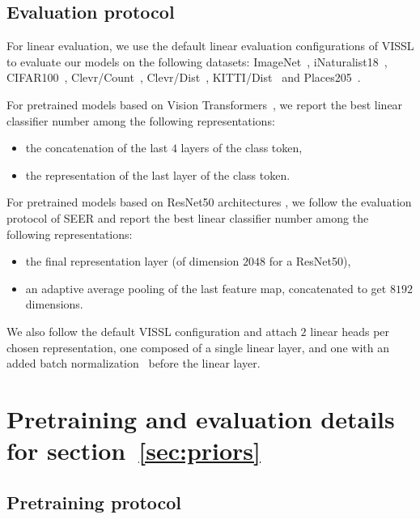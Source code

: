 \documentclass{article} %
\begin{document}
\subsection{Evaluation protocol}
\label{apndx:classstratified_sampling_eval}

For linear evaluation, we use the default linear evaluation configurations of VISSL \citep{goyal2021vissl} to evaluate our models on the following datasets: ImageNet~\citep{russakovsky2015imagenet}, iNaturalist18~\citep{van2018inaturalist}, CIFAR100~\citep{krizhevsky2009learning}, Clevr/Count~\citep{johnson2017clevr}, Clevr/Dist~\citep{johnson2017clevr}, KITTI/Dist~\citep{geiger2013vision} and Places205~\citep{zhou2014learning}.

For pretrained models based on Vision Transformers~\citep{dosovitskiy2020image}, we report the best linear classifier number among the following representations:
\begin{itemize}
\item the concatenation of the last $4$ layers of the class token, \citep{caron2021emerging}
\item the representation of the last layer of the class token.
\end{itemize}

For pretrained models based on ResNet50 architectures \citep{he2016deep}, we follow the evaluation protocol of SEER \citep{goyal2022vision} and report the best linear classifier number among the following representations:
\begin{itemize}
\item the final representation layer (of dimension $2048$ for a ResNet50),
\item an adaptive average pooling of the last feature map,  concatenated to get $8192$ dimensions.
\end{itemize}

We also follow the default VISSL \citep{goyal2021vissl} configuration and attach $2$ linear heads per chosen representation, one composed of a single linear layer, and one with an added batch normalization~\citep{https://doi.org/10.48550/arxiv.1502.03167} before the linear layer.


\section{Pretraining and evaluation details for section~\ref{sec:priors}}
\label{apndx:priors}

\subsection{Pretraining protocol}
\end{document}
